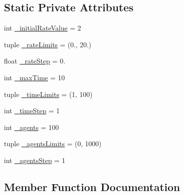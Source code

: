 \subsection*{Static Private Attributes}
\begin{DoxyCompactItemize}
\item 
int \hyperlink{class_mu_mo_t_1_1_mu_mo_t_1_1_mu_mo_tdefault_adbfda01292fc4c7936ed57523fd625c7}{\+\_\+initial\+Rate\+Value} = 2
\item 
tuple \hyperlink{class_mu_mo_t_1_1_mu_mo_t_1_1_mu_mo_tdefault_a89f788e3d778e1e0554c57832275d484}{\+\_\+rate\+Limits} = (0., 20.)
\item 
float \hyperlink{class_mu_mo_t_1_1_mu_mo_t_1_1_mu_mo_tdefault_aa45ec6be070d9881c9c018a533f6573c}{\+\_\+rate\+Step} = 0.
\item 
int \hyperlink{class_mu_mo_t_1_1_mu_mo_t_1_1_mu_mo_tdefault_a46ffe9aa10cdab976a57d8ba1d3cd2f6}{\+\_\+max\+Time} = 10
\item 
tuple \hyperlink{class_mu_mo_t_1_1_mu_mo_t_1_1_mu_mo_tdefault_a2208809031da7f126f4416fb64cdb026}{\+\_\+time\+Limits} = (1, 100)
\item 
int \hyperlink{class_mu_mo_t_1_1_mu_mo_t_1_1_mu_mo_tdefault_ad83203bcc6032b30e6f5b57f8982af9e}{\+\_\+time\+Step} = 1
\item 
int \hyperlink{class_mu_mo_t_1_1_mu_mo_t_1_1_mu_mo_tdefault_a42f05ec35f2b5b564e064bb19ebd36cf}{\+\_\+agents} = 100
\item 
tuple \hyperlink{class_mu_mo_t_1_1_mu_mo_t_1_1_mu_mo_tdefault_a01360abcb6eddb212c38b66852c35e17}{\+\_\+agents\+Limits} = (0, 1000)
\item 
int \hyperlink{class_mu_mo_t_1_1_mu_mo_t_1_1_mu_mo_tdefault_a55b7c54066a90600796a35e96ef5743b}{\+\_\+agents\+Step} = 1
\end{DoxyCompactItemize}


\subsection{Member Function Documentation}
\mbox{\label{class_mu_mo_t_1_1_mu_mo_t_1_1_mu_mo_tdefault_a390063ec9e63f433bf06fa72f608b7e4}} 
